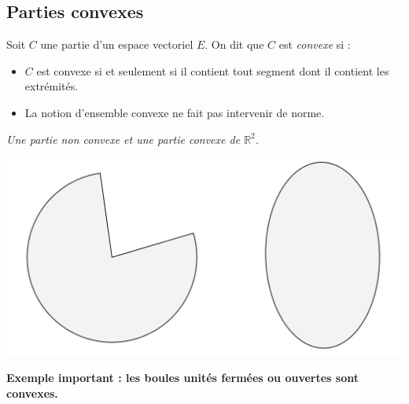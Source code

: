 \documentclass[french,11pt,twoside]{VcCours}
\begin{document}
\subsection{Parties convexes}

\begin{Definition}{} Soit $C$ une partie d'un espace vectoriel $E$. On dit que $C$ est \emph{convexe} si :

\vspace{1cm}

\end{Definition}

\begin{Remarques}{}
\begin{itemize} 
\item $C$ est convexe si et seulement si il contient tout segment dont il contient les extrémités.
\item La notion d'ensemble convexe ne fait pas intervenir de norme.
\end{itemize}
\end{Remarques}{}

\begin{center}
\emph{Une partie non convexe et une partie convexe de $\mathbb{R}^2$.}
\end{center}

\begin{center}
\includegraphics[scale=0.5]{Convexes}
\end{center}

\textbf{Exemple important : les boules unités fermées ou ouvertes sont convexes.}
\end{document}
